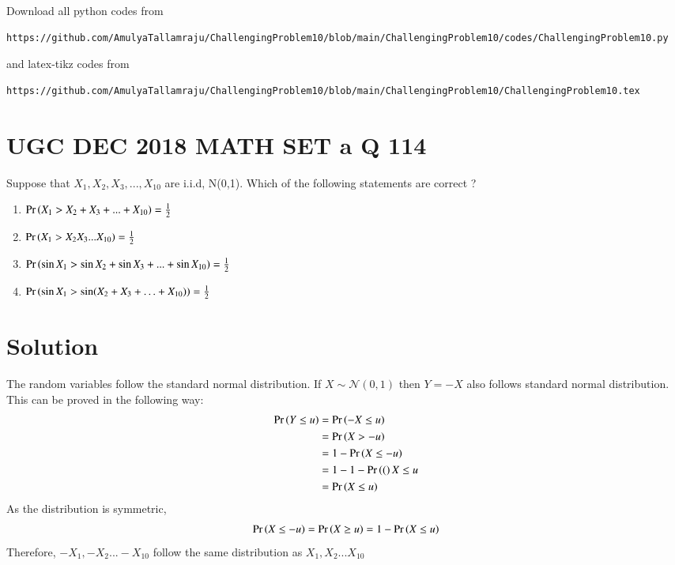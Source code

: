 \documentclass[journal,12pt,twocolumn]{IEEEtran}
\begin{document}
\author{Amulya Tallamraju - AI20BTECH11003}
\maketitle
\newpage
\bigskip
\renewcommand{\thefigure}{\theenumi}
\renewcommand{\thetable}{\theenumi}
\newcommand*{\permcomb}[4][0mu]{{{}^{#3}\mkern#1#2_{#4}}}
\newcommand*{\perm}[1][-3mu]{\permcomb[#1]{P}}
\newcommand*{\comb}[1][-1mu]{\permcomb[#1]{C}}
Download all python codes from 
\begin{lstlisting}
https://github.com/AmulyaTallamraju/ChallengingProblem10/blob/main/ChallengingProblem10/codes/ChallengingProblem10.py
\end{lstlisting}
%
and latex-tikz codes from 
%
\begin{lstlisting}
https://github.com/AmulyaTallamraju/ChallengingProblem10/blob/main/ChallengingProblem10/ChallengingProblem10.tex
\end{lstlisting}
\section*{UGC DEC 2018 MATH SET a Q 114}
Suppose that $X_1,X_2,X_3,...,X_{10}$ are i.i.d, N(0,1). Which of the following statements are correct ?
\begin{enumerate}[label = (\Alph*)]
    \item $\Pr\left(X_1>X_2+X_3+...+X_{10}\right)=\frac{1}{2}$
    \item $\Pr\left(X_1>X_2X_3...X_{10}\right)=\frac{1}{2}$
    \item $\Pr\left(\sin{X_1}>\sin{X_2}+\sin{X_3}+...+\sin{X_{10}}\right)=\frac{1}{2}$
    \item $\Pr\left(\sin{X_1}>\sin({X_2+X_3+\ldots+X_{10}})\right)=\frac{1}{2}$
\end{enumerate}
\section*{Solution}
The random variables follow the standard normal distribution. If $X \sim \mathcal{N}(0,1)$ then $Y =-X$ also follows standard normal distribution. This can be proved in the following way:
\begin{align}
    \Pr\left(Y \leq u\right) &= \Pr\left(-X \leq u\right) \\
    &= \Pr\left(X > -u\right) \\
    &= 1 - \Pr\left(X \leq -u\right) \\
    &= 1 - {1 - \Pr\left((\right)X \leq u} \\
    &= \Pr\left(X \leq u\right) 
\end{align}
As the distribution is symmetric, \begin{align}
 \Pr\left(X\leq -u\right)=\Pr\left(X\geq u\right)= 1-\Pr\left(X\leq u\right)   
\end{align} 
Therefore, $-X_1,-X_2 ... -X_{10}$ follow the same distribution as $X_1,X_2...X_{10}$
\end{document}
